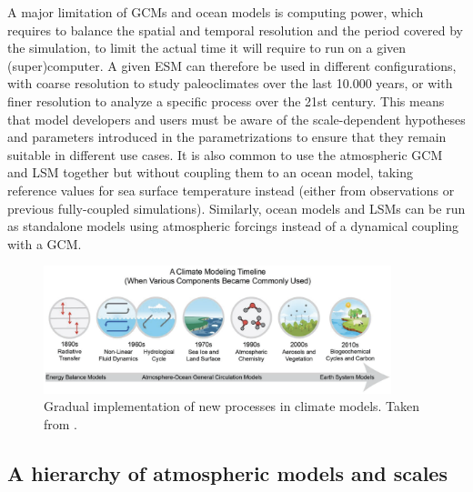 A major limitation of GCMs and ocean models is computing power, which requires to balance the spatial and temporal resolution and the period covered by the simulation, to limit the actual time it will require to run on a given (super)computer. A given ESM can therefore be used in different configurations, with coarse resolution to study paleoclimates over the last 10.000 years, or with finer resolution to analyze a specific process over the 21st century. This means that model developers and users must be aware of the scale-dependent hypotheses and parameters introduced in the parametrizations to ensure that they remain suitable in different use cases.
It is also common to use the atmospheric GCM and LSM together but without coupling them to an ocean model, taking reference values for sea surface temperature instead (either from observations or previous fully-coupled simulations). Similarly, ocean models and LSMs can be run as standalone models using atmospheric forcings instead of a dynamical coupling with a GCM.

\begin{figure}[hbtp]
    \centering
    \includegraphics[width=0.9\textwidth]{images/intro/climate_modelling_evolution_kotamarthi.png}
    \caption{Gradual implementation of new processes in climate models. Taken from \citep{kotamarthi_downscaling_2021}. 
    }
    \label{fig:GCM_processes}
\end{figure}

\subsection{A hierarchy of atmospheric models and scales}


